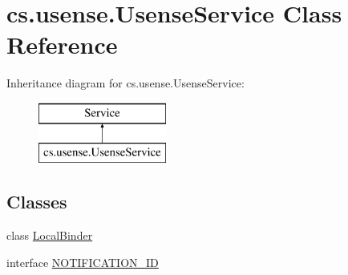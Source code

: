 \hypertarget{classcs_1_1usense_1_1_usense_service}{}\section{cs.\+usense.\+Usense\+Service Class Reference}
\label{classcs_1_1usense_1_1_usense_service}
Inheritance diagram for cs.\+usense.\+Usense\+Service\+:\begin{figure}[H]
\begin{center}
\leavevmode
\includegraphics[height=2.000000cm]{classcs_1_1usense_1_1_usense_service}
\end{center}
\end{figure}
\subsection*{Classes}
\begin{DoxyCompactItemize}
\item 
class \hyperlink{classcs_1_1usense_1_1_usense_service_1_1_local_binder}{Local\+Binder}
\item 
interface \hyperlink{interfacecs_1_1usense_1_1_usense_service_1_1_n_o_t_i_f_i_c_a_t_i_o_n___i_d}{N\+O\+T\+I\+F\+I\+C\+A\+T\+I\+O\+N\+\_\+\+I\+D}
\end{DoxyCompactItemize}
